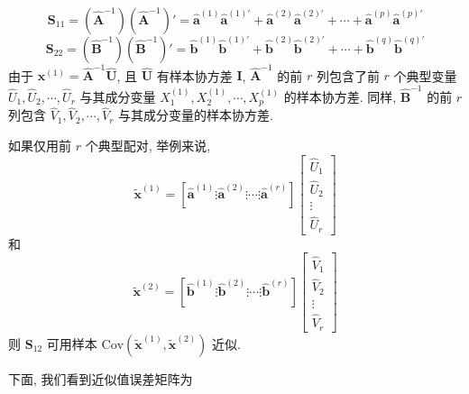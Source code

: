 \[
\mathbf{S}_{11}=(\hat{\mathbf{A}}^{-1})(\hat{\mathbf{A}}^{-1})'=\hat{\mathbf{a}}^{(1)}\hat{\mathbf{a}}^{(1)'}+\hat{\mathbf{a}}^{(2)}\hat{\mathbf{a}}^{(2)'}+\cdots+\hat{\mathbf{a}}^{(p)}\hat{\mathbf{a}}^{(p)'}
\]
\[
\mathbf{S}_{22}=(\hat{\mathbf{B}}^{-1})(\hat{\mathbf{B}}^{-1})'=\hat{\mathbf{b}}^{(1)}\hat{\mathbf{b}}^{(1)'}+\hat{\mathbf{b}}^{(2)}\hat{\mathbf{b}}^{(2)'}+\cdots+\hat{\mathbf{b}}^{(q)}\hat{\mathbf{b}}^{(q)'}
\]
由于 $\mathbf{x}^{(1)}=\hat{\mathbf{A}}^{-1}\hat{\mathbf{U}}$, 且 $\hat{\mathbf{U}}$ 有样本协方差 $\mathbf{I}$, $\hat{\mathbf{A}}^{-1}$ 的前 $r$ 列包含了前 $r$ 个典型变量 $\hat{U}_1,\hat{U}_2,\cdots,\hat{U}_r$ 与其成分变量 $X_1^{(1)},X_2^{(1)},\cdots,X_p^{(1)}$ 的样本协方差. 同样, $\hat{\mathbf{B}}^{-1}$ 的前 $r$ 列包含 $\hat{V}_1,\hat{V}_2,\cdots,\hat{V}_r$ 与其成分变量的样本协方差.

如果仅用前 $r$ 个典型配对, 举例来说,
\[
\tilde{\mathbf{x}}^{(1)}=[\hat{\mathbf{a}}^{(1)}\vdots\hat{\mathbf{a}}^{(2)}\vdots\cdots\vdots\hat{\mathbf{a}}^{(r)}]\begin{bmatrix}\hat{U}_1\\\hat{U}_2\\\vdots\\\hat{U}_r\end{bmatrix}
\]
和
\label{eq:10-33}
\begin{equation}
\tilde{\mathbf{x}}^{(2)}=[\hat{\mathbf{b}}^{(1)}\vdots\hat{\mathbf{b}}^{(2)}\vdots\cdots\vdots\hat{\mathbf{b}}^{(r)}]\begin{bmatrix}\hat{V}_1\\\hat{V}_2\\\vdots\\\hat{V}_r\end{bmatrix}
\tag{10-33}
\end{equation}
则 $\mathbf{S}_{12}$ 可用样本 $\mathrm{Cov}(\tilde{\mathbf{x}}^{(1)},\tilde{\mathbf{x}}^{(2)})$ 近似.

下面, 我们看到近似值误差矩阵为
